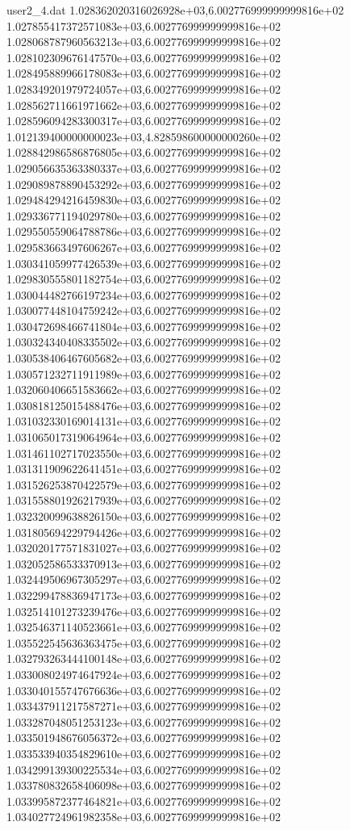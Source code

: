 \begin{filecontents}{user2_4.dat}
1.028362020316026928e+03,6.002776999999999816e+02
1.027855417372571083e+03,6.002776999999999816e+02
1.028068787960563213e+03,6.002776999999999816e+02
1.028102309676147570e+03,6.002776999999999816e+02
1.028495889966178083e+03,6.002776999999999816e+02
1.028349201979724057e+03,6.002776999999999816e+02
1.028562711661971662e+03,6.002776999999999816e+02
1.028596094283300317e+03,6.002776999999999816e+02
1.012139400000000023e+03,4.828598600000000260e+02
1.028842986586876805e+03,6.002776999999999816e+02
1.029056635363380337e+03,6.002776999999999816e+02
1.029089878890453292e+03,6.002776999999999816e+02
1.029484294216459830e+03,6.002776999999999816e+02
1.029336771194029780e+03,6.002776999999999816e+02
1.029550559064788786e+03,6.002776999999999816e+02
1.029583663497606267e+03,6.002776999999999816e+02
1.030341059977426539e+03,6.002776999999999816e+02
1.029830555801182754e+03,6.002776999999999816e+02
1.030044482766197234e+03,6.002776999999999816e+02
1.030077448104759242e+03,6.002776999999999816e+02
1.030472698466741804e+03,6.002776999999999816e+02
1.030324340408335502e+03,6.002776999999999816e+02
1.030538406467605682e+03,6.002776999999999816e+02
1.030571232711911989e+03,6.002776999999999816e+02
1.032060406651583662e+03,6.002776999999999816e+02
1.030818125015488476e+03,6.002776999999999816e+02
1.031032330169014131e+03,6.002776999999999816e+02
1.031065017319064964e+03,6.002776999999999816e+02
1.031461102717023550e+03,6.002776999999999816e+02
1.031311909622641451e+03,6.002776999999999816e+02
1.031526253870422579e+03,6.002776999999999816e+02
1.031558801926217939e+03,6.002776999999999816e+02
1.032320099638826150e+03,6.002776999999999816e+02
1.031805694229794426e+03,6.002776999999999816e+02
1.032020177571831027e+03,6.002776999999999816e+02
1.032052586533370913e+03,6.002776999999999816e+02
1.032449506967305297e+03,6.002776999999999816e+02
1.032299478836947173e+03,6.002776999999999816e+02
1.032514101273239476e+03,6.002776999999999816e+02
1.032546371140523661e+03,6.002776999999999816e+02
1.035522545636363475e+03,6.002776999999999816e+02
1.032793263444100148e+03,6.002776999999999816e+02
1.033008024974647924e+03,6.002776999999999816e+02
1.033040155747676636e+03,6.002776999999999816e+02
1.033437911217587271e+03,6.002776999999999816e+02
1.033287048051253123e+03,6.002776999999999816e+02
1.033501948676056372e+03,6.002776999999999816e+02
1.033533940354829610e+03,6.002776999999999816e+02
1.034299139300225534e+03,6.002776999999999816e+02
1.033780832658406098e+03,6.002776999999999816e+02
1.033995872377464821e+03,6.002776999999999816e+02
1.034027724961982358e+03,6.002776999999999816e+02

\end{filecontents}
